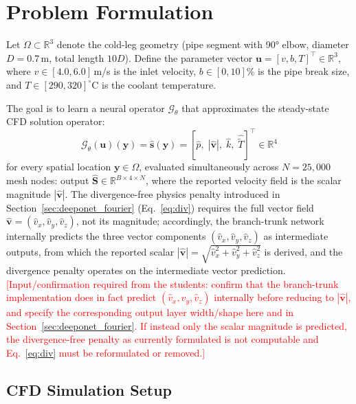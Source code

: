 \documentclass[journal]{IEEEtran}
\begin{document}
\section{Problem Formulation}
\label{sec:problem}

Let $\Omega \subset \mathbb{R}^3$ denote the cold-leg geometry (pipe segment with 90° elbow, diameter $D = 0.7$\,m, total length $10D$). Define the parameter vector $\bm{u} = [v, b, T]^\top \in \mathbb{R}^3$, where $v \in [4.0, 6.0]$\,m/s is the inlet velocity, $b \in [0, 10]$\% is the pipe break size, and $T \in [290, 320]^\circ$C is the coolant temperature.

The goal is to learn a neural operator $\mathcal{G}_\theta$ that approximates the steady-state CFD solution operator:
\begin{equation}
\mathcal{G}_\theta(\bm{u})(\bm{y}) = \hat{\bm{s}}(\bm{y}) = [\hat{p},\; |\hat{\bm{v}}|,\; \hat{k},\; \hat{\tilde{T}}]^\top \in \mathbb{R}^4
\label{eq:operator}
\end{equation}
for every spatial location $\bm{y} \in \Omega$, evaluated simultaneously across $N = 25{,}000$ mesh nodes: output $\hat{\bm{S}} \in \mathbb{R}^{B \times 4 \times N}$, where the reported velocity field is the scalar magnitude $|\hat{\bm v}|$. The divergence-free physics penalty introduced in Section~\ref{sec:deeponet_fourier} (Eq.~\ref{eq:div}) requires the full vector field $\hat{\bm v} = (\hat v_x, \hat v_y, \hat v_z)$, not its magnitude; accordingly, the branch-trunk network internally predicts the three vector components $(\hat v_x, \hat v_y, \hat v_z)$ as intermediate outputs, from which the reported scalar $|\hat{\bm v}| = \sqrt{\hat v_x^2 + \hat v_y^2 + \hat v_z^2}$ is derived, and the divergence penalty operates on the intermediate vector prediction. \textcolor{red}{[Input/confirmation required from the students: confirm that the branch-trunk implementation does in fact predict $(\hat v_x, \hat v_y, \hat v_z)$ internally before reducing to $|\hat{\bm v}|$, and specify the corresponding output layer width/shape here and in Section~\ref{sec:deeponet_fourier}. If instead only the scalar magnitude is predicted, the divergence-free penalty as currently formulated is not computable and Eq.~\ref{eq:div} must be reformulated or removed.]}

\subsection{CFD Simulation Setup}
\end{document}

